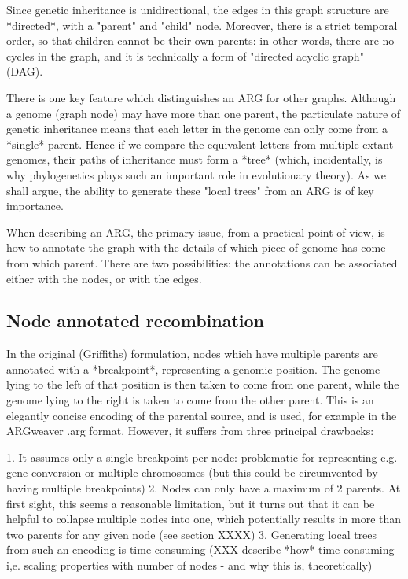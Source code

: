 \documentclass{article}
\begin{document}
Since genetic inheritance is unidirectional, the edges in this graph structure are *directed*,
with a "parent" and "child" node. Moreover, there is a strict temporal order, so that children
cannot be their own parents: in other words, there are no cycles in the graph, and it is
technically a form of "directed acyclic graph" (DAG).


There is one key feature which distinguishes an ARG for other graphs. Although a genome
(graph node) may have more than one parent, the particulate nature of genetic inheritance
means that each letter in the genome can only come from a *single* parent. Hence if we
compare the equivalent letters from multiple extant genomes, their paths of inheritance must
form a *tree* (which, incidentally, is why phylogenetics plays such an important role in evolutionary
theory). As we shall argue, the ability to generate these "local trees" from an ARG is of key
importance.

When describing an ARG, the primary issue, from a practical point of view, is how to annotate
the graph with the details of which piece of genome has come from which parent. There
are two possibilities: the annotations can be associated either with the nodes, or with the edges.

\subsection*{Node annotated recombination}

In the original (Griffiths) formulation, nodes which have multiple parents are annotated with a
*breakpoint*, representing a genomic position. The genome lying to the left of that position is then taken to come from one parent, while the genome lying to the right is taken to come from the other parent. This is an elegantly concise encoding of the parental source, and is used, for example in the ARGweaver .arg format. However, it suffers from three principal drawbacks:

1. It assumes only a single breakpoint per node: problematic for representing e.g. gene conversion or 
multiple chromosomes (but this could be circumvented by having multiple breakpoints)
2. Nodes can only have a maximum of 2 parents. At first sight, this seems a reasonable limitation,
but it turns out that it can be helpful to collapse multiple nodes into one, which potentially results
in more than two parents for any given node (see section XXXX)
3. Generating local trees from such an encoding is time consuming (XXX describe *how* time consuming - i,e. scaling properties with number of nodes - and why this is, theoretically)
\end{document}
